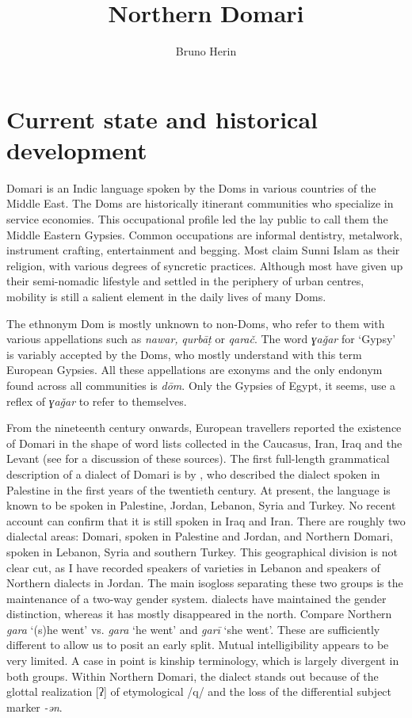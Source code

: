\documentclass[output=paper]{langsci/langscibook}
\author{Bruno Herin\affiliation{Inalco, IUF}}
\title{Northern Domari}
\begin{document}
\maketitle
 
\section{Current state and historical development}

Domari is an Indic language spoken by the Doms in various countries of the Middle East. The Doms are historically itinerant communities who specialize in service economies. This occupational profile led the lay public to call them the Middle Eastern Gypsies. Common occupations are informal dentistry, metalwork, instrument crafting, entertainment and begging. Most claim Sunni Islam as their religion, with various degrees of syncretic practices. Although most have given up their semi-nomadic lifestyle and settled in the periphery of urban centres, mobility is still a salient element in the daily lives of many Doms.

The ethnonym Dom is mostly unknown to non-Doms, who refer to them with various appellations such as \textit{nawar,} \textit{qurbāṭ} or \textit{qarač}. The   word \textit{ɣa\v{g}ar} for `Gypsy' is variably accepted by the Doms, who mostly understand with this term European Gypsies. All these appellations are exonyms and the only endonym found across all communities is \textit{dōm}. Only the Gypsies of Egypt, it seems, use a reflex of \textit{ɣa\v{g}ar} to refer to themselves. 

From the nineteenth century onwards, European travellers reported the existence of Domari in the shape of word lists collected in the Caucasus, Iran, Iraq and the Levant (see \citealt{Herin2012} for a discussion of these sources). The first full-length grammatical description of a dialect of Domari is by \citet{Macalister1914}, who described the dialect spoken in Palestine in the first years of the twentieth century. At present, the language is known to be spoken in Palestine, Jordan, Lebanon, Syria and Turkey. No recent account can confirm that it is still spoken in Iraq and Iran. There are roughly two dialectal areas:  Domari, spoken in Palestine and Jordan, and Northern Domari, spoken in Lebanon, Syria and southern Turkey. This geographical division is not clear cut, as I have recorded speakers of  varieties in Lebanon and speakers of Northern dialects in Jordan. The main isogloss separating these two groups is the maintenance of a two-way {gender} system.  dialects have maintained the {gender} distinction, whereas it has mostly disappeared in the north. Compare Northern \textit{gara} ‘(s)he went’ vs.  \textit{gara} ‘he went’ and \textit{garī} ‘she went’. These are sufficiently different to allow us to posit an early split. Mutual intelligibility appears to be very limited. A case in point is {kinship terminology}, which is largely divergent in both groups. Within Northern Domari, the  dialect stands out because of the glottal realization [ʔ] of etymological /q/ and the loss of the differential subject marker \textit{-ən}. 
\end{document}
